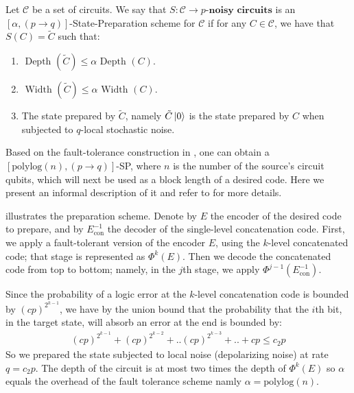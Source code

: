 \documentclass[manuscript,screen,review]{acmart}
\begin{document}
{\begin{definition} Let $\mathcal{C}$ be a set of circuits. We say that $S : \mathcal{C} \rightarrow p\textbf{-noisy circuits} $ is an $\left[ \alpha , (p \rightarrow q) \right]$-State-Preparation scheme for $\mathcal{C}$ if for any $C \in \mathcal{C}$, we have that $S(C) = \tilde{C}$ such that:
  \begin{enumerate}
    \item $\text{ Depth } (\tilde{C} ) \le \alpha \text{ Depth } (C )$. 
    \item $\text{ Width } (\tilde{C} ) \le \alpha \text{ Width } (C )$. 
    \item The state prepared by $\tilde{C}$, namely $\tilde{C}\ket{0}$ is the state prepared by $C$ when subjected to $q$-local stochastic noise. 
  \end{enumerate}  
  \end{definition}
Based on the fault-tolerance construction in \cite{aharonov1999faulttolerant}, one can obtain a $\left[ \text{polylog}(n) , (p \rightarrow q) \right]$-SP, where $n$ is the number of the source's circuit qubits, which will next be used as a block length of a desired code. Here we present an informal description of it and refer to \cite{grospellier:tel-03364419} for more details.

   illustrates the preparation scheme. Denote by $E$ the encoder of the desired code to prepare, and by $E_{\text{con}}^{-1}$ the decoder of the single-level concatenation code. First, we apply a fault-tolerant version of the encoder $E$, using the $k$-level concatenated code; that stage is represented as $\Phi^{k}(E)$. Then we decode the concatenated code from top to bottom; namely, in the $j$th stage, we apply $\Phi^{j-1}(E_{\text{con}}^{-1})$.
  
  Since the probability of a logic error at the $k$-level concatenation code is bounded by $(cp)^{2^{k-1}}$, we have by the union bound that the probability that the $i$th bit, in the target state, will absorb an error at the end is bounded by:
  \begin{equation*}
    \begin{split}
      \left( cp \right)^{2^{k-1}} + \left( cp \right)^{2^{k-2}} + .. \left( cp \right)^{2^{k-3}} + .. +  cp \le c_{2}p 
    \end{split}
  \end{equation*} So we prepared the state subjected to local noise (depolarizing noise) at rate $q=c_{2}p$. The depth of the circuit is at most two times the depth of $\Phi^{k}(E)$ so $\alpha$ equals the overhead of the fault tolerance scheme namly $\alpha = \text{polylog}(n)$.


}
\end{document}
